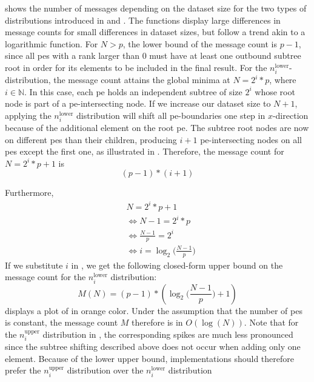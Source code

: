  shows the number of messages depending on the dataset size for the two types of distributions introduced in  and .
The functions display large differences in message counts for small differences in dataset sizes, but follow a trend akin to a logarithmic function.
For $N > p$, the lower bound of the message count is $p - 1$, since all \glspl{pe} with a rank larger than $0$ must have at least one outbound subtree root in order for its elements to be included in the final result.
For the $n_i^\textrm{lower}$-distribution, the message count attains the global minima at $N = 2^i * p$, where $i \in \mathbb{N}$.
In this case, each \gls{pe} holds an independent subtree of size $2^i$ whose root node is part of a \gls{pe}-intersecting node.
If we increase our dataset size to $N+1$, applying the $n_i^\textrm{lower}$ distribution will shift all \gls{pe}-boundaries one step in $x$-direction because of the additional element on the root \gls{pe}.
The subtree root nodes are now on different \glspl{pe} than their children, producing $i + 1$ \gls{pe}-intersecting nodes on all \glspl{pe} except the first one, as illustrated in .
Therefore, the message count for $N = 2^i * p + 1$ is 
\begin{equation}
\label{eq:messageCountI}
(p - 1) * (i + 1)
\end{equation}

Furthermore,
\begin{align*}
&N = 2^i * p + 1 \\ 
&\Leftrightarrow N - 1 = 2^i * p \\
&\Leftrightarrow \frac{N - 1}{p} = 2^i \\
&\Leftrightarrow i = \log_2 \big(\frac{N - 1}{p}\big)
\end{align*}
If we substitute $i$ in , we get the following closed-form upper bound on the message count for the $n_i^\textrm{lower}$ distribution:
\begin{equation}
\label{eq:upperBoundLowerDistribution}
M(N) = (p - 1) * (\log_2 \Big( \frac{N - 1}{p} \Big) + 1)
\end{equation}
 displays a plot of   in orange color.
Under the assumption that the number of \glspl{pe} is constant, the message count $M$ therefore is in $O(\log(N))$.
Note that for the $n_i^\textrm{upper}$ distribution in , the corresponding spikes are much less pronounced since the subtree shifting described above does not occur when adding only one element.
Because of the lower upper bound, implementations should therefore prefer the $n_i^\textrm{upper}$ distribution over the $n_i^\textrm{lower}$ distribution

